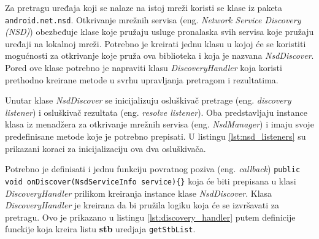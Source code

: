 \documentclass[struktura.tex]{subfiles}
\begin{document}
Za pretragu uređaja koji se nalaze na istoj mreži koristi se klase iz paketa \verb|android.net.nsd|. Otkrivanje mrežnih servisa (eng. \textit{Network Service Discovery (NSD)}) \cite{sajt:nsd} obezbeđuje klase koje pružaju usluge pronalaska svih servisa koje pružaju uređaji na lokalnoj mreži. Potrebno je kreirati jednu klasu u kojoj će se koristiti mogućnosti za otkrivanje koje pruža ova biblioteka i koja je nazvana \textit{NsdDiscover}. Pored ove klase potrebno je napraviti klasu \textit{DiscoveryHandler} koja koristi prethodno kreirane metode u svrhu upravljanja pretragom i rezultatima.

Unutar klase \textit{NsdDiscover} se inicijalizuju osluškivač pretrage (eng. \textit{discovery listener}) i osluškivač rezultata (eng. \textit{resolve listener}). Oba predstavljaju instance klasa iz menadžera za otkrivanje mrežnih servisa (eng. \textit{NsdManager}) i imaju svoje predefinisane metode koje je potrebno prepisati. U listingu \ref{lst:nsd_listeners} su prikazani koraci za inicijalizaciju ova dva osluškivača. 



Potrebno je definisati i jednu funkciju povratnog poziva (eng. \textit{callback}) \verb|public void onDiscover(NsdServiceInfo service){}| koja će biti prepisana u klasi \textit{DiscoveryHandler} prilikom kreiranja instance klase \textit{NsdDiscover}. Klasa \textit{DiscoveryHandler} je kreirana da bi pružila logiku koja će se izvršavati za pretragu. Ovo je prikazano u listingu \ref{lst:discovery_handler} putem definicije funckije koja kreira listu \textbf{stb} uredjaja \verb|getStbList|.


\end{document}
